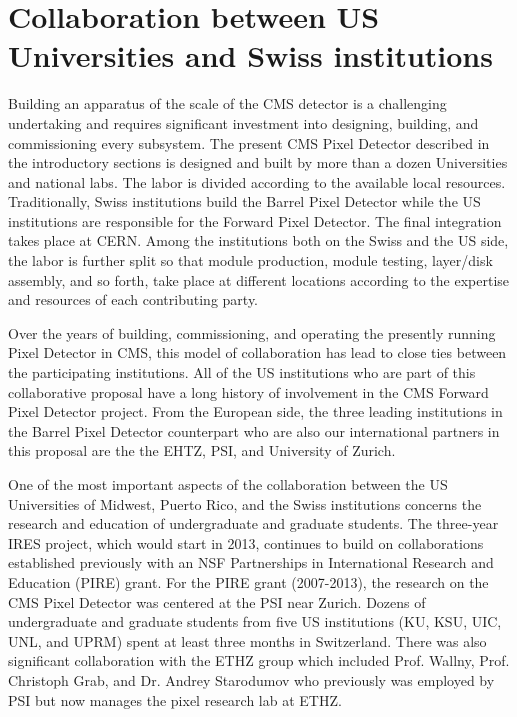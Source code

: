 
\section{Collaboration between US Universities and
Swiss institutions}

Building an apparatus of the scale of the CMS detector is a
challenging undertaking and requires significant investment into
designing, building, and commissioning every subsystem. The present
CMS Pixel Detector described in the introductory sections is designed
and built by more than a dozen Universities and national labs. The
labor is divided according to the available local resources.
Traditionally, Swiss institutions build the Barrel Pixel Detector
while the US institutions are responsible for the Forward Pixel
Detector. The final integration takes place at CERN. Among the
institutions both on the Swiss and the US side, the labor is further
split so that module production, module testing, layer/disk assembly,
and so forth, take place at different locations according to the
expertise and resources of each contributing party.

Over the years of building, commissioning, and operating the presently
running Pixel Detector in CMS, this model of collaboration has lead to
close ties between the participating institutions. All of the US
institutions who are part of this collaborative proposal have a long
history of involvement in the CMS Forward Pixel Detector project. From
the European side, the three leading institutions in the Barrel Pixel
Detector counterpart who are also our international partners in this
proposal are the the EHTZ, PSI, and University of Zurich.

One of the most important aspects of the collaboration between the US
Universities of Midwest, Puerto Rico, and the Swiss institutions
concerns the research and education of undergraduate and graduate
students. The three-year IRES project, which would start in 2013,
continues to build on collaborations established previously with an
NSF Partnerships in International Research and Education (PIRE)
grant. For the PIRE grant (2007-2013), the research on the CMS Pixel
Detector was centered at the PSI near Zurich. Dozens of undergraduate
and graduate students from five US institutions (KU, KSU, UIC, UNL,
and UPRM) spent at least three months in Switzerland.  There was also
significant collaboration with the ETHZ group which included
Prof. Wallny, Prof. Christoph Grab, and Dr. Andrey Starodumov who
previously was employed by PSI but now manages the pixel research lab
at ETHZ.

